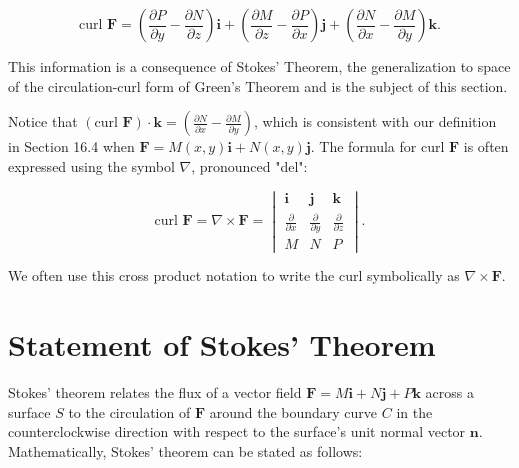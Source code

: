 \documentclass{article}
\begin{document}
\[
\text{curl } \mathbf{F} = \left(\frac{{\partial P}}{{\partial y}} - \frac{{\partial N}}{{\partial z}}\right)\mathbf{i} + \left(\frac{{\partial M}}{{\partial z}} - \frac{{\partial P}}{{\partial x}}\right)\mathbf{j} + \left(\frac{{\partial N}}{{\partial x}} - \frac{{\partial M}}{{\partial y}}\right)\mathbf{k}.
\]

This information is a consequence of Stokes' Theorem, the generalization to space of the circulation-curl form of Green's Theorem and is the subject of this section.

Notice that $(\text{curl } \mathbf{F}) \cdot \mathbf{k} = \left(\frac{{\partial N}}{{\partial x}} - \frac{{\partial M}}{{\partial y}}\right)$, which is consistent with our definition in Section 16.4 when $\mathbf{F} = M(x, y)\mathbf{i} + N(x, y)\mathbf{j}$. The formula for curl $\mathbf{F}$ is often expressed using the symbol $\nabla$, pronounced "del":

\[
\text{curl } \mathbf{F} = \nabla \times \mathbf{F} = \begin{vmatrix} \mathbf{i} & \mathbf{j} & \mathbf{k} \\ \frac{{\partial}}{{\partial x}} & \frac{{\partial}}{{\partial y}} & \frac{{\partial}}{{\partial z}} \\ M & N & P \end{vmatrix}.
\]

We often use this cross product notation to write the curl symbolically as $\nabla \times \mathbf{F}$.

\section{Statement of Stokes' Theorem}

Stokes' theorem relates the flux of a vector field $\mathbf{F} = M\mathbf{i} + N\mathbf{j} + P\mathbf{k}$ across a surface $S$ to the circulation of $\mathbf{F}$ around the boundary curve $C$ in the counterclockwise direction with respect to the surface's unit normal vector $\mathbf{n}$. Mathematically, Stokes' theorem can be stated as follows:
\end{document}
